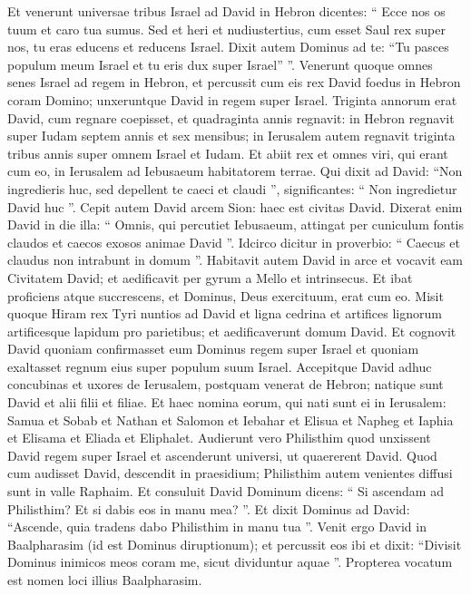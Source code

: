 \begin{biblechapter}
\begin{biblechapter}
\begin{biblechapter}
\begin{biblechapter}
\begin{biblechapter}
\verse Et venerunt universae tribus Israel ad David in Hebron dicentes: “ Ecce nos os tuum et caro tua sumus. 
\verse Sed et heri et nudiustertius, cum esset Saul rex super nos, tu eras educens et reducens Israel. Dixit autem Dominus ad te: “Tu pasces populum meum Israel et tu eris dux super Israel” ”. 
\verse Venerunt quoque omnes senes Israel ad regem in Hebron, et percussit cum eis rex David foedus in Hebron coram Domino; unxeruntque David in regem super Israel. 
 \verse Triginta annorum erat David, cum regnare coepisset, et quadraginta annis regnavit: 
\verse in Hebron regnavit super Iudam septem annis et sex mensibus; in Ierusalem autem regnavit triginta tribus annis super omnem Israel et Iudam.
 \verse Et abiit rex et omnes viri, qui erant cum eo, in Ierusalem ad Iebusaeum habitatorem terrae. Qui dixit ad David: “Non ingredieris huc, sed depellent te caeci et claudi ”, significantes: “ Non ingredietur David huc ”. 
\verse Cepit autem David arcem Sion: haec est civitas David. 
\verse Dixerat enim David in die illa: “ Omnis, qui percutiet Iebusaeum, attingat per cuniculum fontis claudos et caecos exosos animae David ”. Idcirco dicitur in proverbio: “ Caecus et claudus non intrabunt in domum ”. 
\verse Habitavit autem David in arce et vocavit eam Civitatem David; et aedificavit per gyrum a Mello et intrinsecus. 
\verse Et ibat proficiens atque succrescens, et Dominus, Deus exercituum, erat cum eo.
 \verse Misit quoque Hiram rex Tyri nuntios ad David et ligna cedrina et artifices lignorum artificesque lapidum pro parietibus; et aedificaverunt domum David. 
 \verse Et cognovit David quoniam confirmasset eum Dominus regem super Israel et quoniam exaltasset regnum eius super populum suum Israel.
 \verse Accepitque David adhuc concubinas et uxores de Ierusalem, postquam venerat de Hebron; natique sunt David et alii filii et filiae. 
\verse Et haec nomina eorum, qui nati sunt ei in Ierusalem: Samua et Sobab et Nathan et Salomon 
\verse et Iebahar et Elisua et Napheg 
\verse et Iaphia et Elisama et Eliada et Eliphalet.
 \verse Audierunt vero Philisthim quod unxissent David regem super Israel et ascenderunt universi, ut quaererent David. Quod cum audisset David, descendit in praesidium; 
\verse Philisthim autem venientes diffusi sunt in valle Raphaim. 
 \verse Et consuluit David Dominum dicens: “ Si ascendam ad Philisthim? Et si dabis eos in manu mea? ”. Et dixit Dominus ad David: “Ascende, quia tradens dabo Philisthim in manu tua ”. 
\verse Venit ergo David in Baalpharasim (id est Dominus diruptionum); et percussit eos ibi et dixit: “Divisit Dominus inimicos meos coram me, sicut dividuntur aquae ”. Propterea vocatum est nomen loci illius Baalpharasim. 

\end{biblechapter}
\end{biblechapter}
\end{biblechapter}
\end{biblechapter}
\end{biblechapter}
